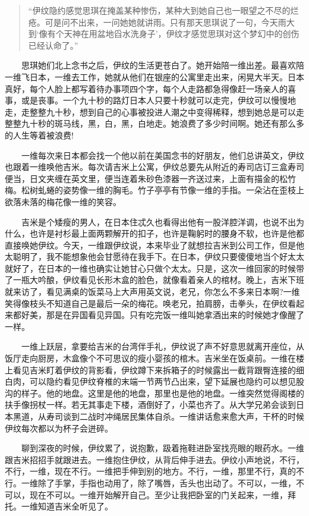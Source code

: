 \documentclass[12pt,UTF8]{ctexbook}
\begin{document}
\begin{quote}
\enquote{伊纹隐约感觉思琪在掩盖某种惨伤，某种大到她自己也一眼望之不尽的烂疮。可是问不出来，一问她她就讲雨。只有那天思琪说了一句，今天雨大到\enquote{像有个天神在用盆地舀水洗身子}，伊纹才感觉思琪对这个梦幻中的创伤已经认命了。}
\end{quote}

　　思琪她们北上念书之后，伊纹的生活更苍白了。她开始陪一维出差。最喜欢陪一维飞日本，一维去工作，她就从他们在银座的公寓里走出来，闲晃大半天。日本真好，每个人脸上都写着待办事项四个字，每个人走路都急得像赶一场亲人的喜事，或是丧事。一个九十秒的路灯日本人只要十秒就可以走完，伊纹可以慢慢地走，走整整九十秒，想到自己的心事被投进人潮之中变得稀释，想到她总是可以走整整九十秒的斑马线，黑，白，黑，白地走。她浪费了多少时间啊。她还有那么多的人生等着被浪费!

　　一维每次来日本都会找一个他以前在美国念书的好朋友，他们总讲英文，伊纹也跟着一维唤他吉米。每次请吉米上公寓，伊纹总要先从附近的寿司店订三盒寿司便当，日文夹缠在英文里，便当连着朱砂色漆器一齐送过来，上面有描金的松竹梅。松树虬蜷的姿势像一维的胸毛。竹子亭亭有节像一维的手指。一朵沾在歪枝上欲落未落的梅花像一维的笑容。

　　吉米是个矮瘦的男人，在日本住忒久也看得出他有一股洋腔洋调，也说不出为什么，也许是衬杉最上面两颗解开的扣子，也许是鞠躬时的腰身不软，也许是他都直接唤她伊纹。今天，一维跟伊纹说，本来毕业了就想拉吉米到公司工作，但是他太聪明了，我不能想象他会甘愿待在我手下。在日本，伊纹只要傻傻地当个好太太就好了，在日本的一维也确实让她甘心只做个太太。只是，这次一维回家的时候带了一瓶大吟酿，伊纹看见长形木盒的脸色，就像看着亲人的棺材。晚上，吉米下班就来访了，看见满桌的饭菜马上大声用英文说，老兄，你怎么不多来日本啊?一维笑得像枝头不知道自己是最后一朵的梅花。唤老兄，拍肩膀，击拳头，在伊纹看起来都好美，那是在异国看见异国。只有吃完饭一维叫她拿酒出来的时候她才像醒了一样。

　　一维上跃层，拿要给吉米的台湾伴手礼，伊纹说了声不好意思就离开座位，从饭厅走向厨房，木盒像个不可思议的瘦小婴孩的棺木。吉米坐在饭桌前。一维在楼上看见吉米盯着伊纹的背影看，伊纹蹲下来拆箱子的时候露出一截背跟臀连接的细白肉，可以隐约看见伊纹脊椎的末端一节两节凸出来，望下延展也隐约可以想见股沟的样子。他的地盘。这里是他的地盘，那里也是他的地盘。一维突然觉得阁楼的扶手像拐杖一样。若无其事走下楼，酒倒好了，小菜也齐了。从大学兄弟会谈到日本黑道，从寿司谈到二战时冲绳居民集体自杀。一维讲话愈来愈大声，干杯的时候伊纹每次都以为杯子会迸碎。

　　聊到深夜的时候，伊纹累了，说抱歉，趿着拖鞋进卧室找亮眼的眼药水。一维跟吉米招招手就跟进去。一维抱住伊纹，从背后伸手进去。伊纹小声地说，不行，不行，一维，现在不行。一维把手伸到别的地方。不行，一维，那里不行，真的不行。一维除了手掌，手指也动用了，除了嘴唇，舌头也出动了。不可以，一维，不可以，现在不可以。一维开始解开自己。至少让我把卧室的门关起来，一维，拜托。一维知道吉米全听见了。
\end{document}
